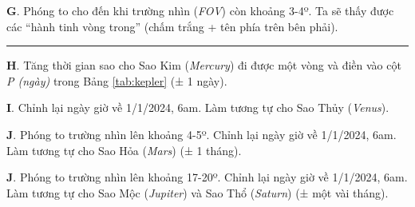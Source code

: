 \documentclass[
]{book}
\begin{document}
\textbf{G}. Phóng to cho đến khi trường nhìn (\emph{FOV}) còn khoảng 3-4º. Ta sẽ thấy được các ``hành tinh vòng trong'' (chấm trắng + tên phía trên bên phải).

\begin{center}\rule{0.5\linewidth}{0.5pt}\end{center}

\textbf{H}. Tăng thời gian sao cho Sao Kim (\emph{Mercury}) đi được một vòng và điền vào cột \emph{P (ngày)} trong Bảng \ref{tab:kepler} (± 1 ngày).

\textbf{I}. Chỉnh lại ngày giờ về 1/1/2024, 6am. Làm tương tự cho Sao Thủy (\emph{Venus}).

\textbf{J}. Phóng to trường nhìn lên khoảng 4-5º. Chỉnh lại ngày giờ về 1/1/2024, 6am. Làm tương tự cho Sao Hỏa (\emph{Mars}) (± 1 tháng).

\textbf{J}. Phóng to trường nhìn lên khoảng 17-20º. Chỉnh lại ngày giờ về 1/1/2024, 6am. Làm tương tự cho Sao Mộc (\emph{Jupiter}) và Sao Thổ (\emph{Saturn}) (± một vài tháng).
\end{document}

